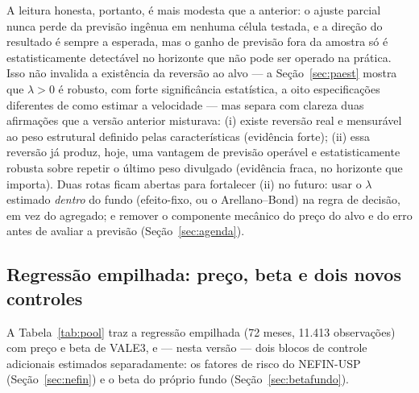 \documentclass[12pt,a4paper]{article}
\begin{document}
A leitura honesta, portanto, é mais modesta que a anterior: o ajuste parcial nunca perde da
previsão ingênua em nenhuma célula testada, e a direção do resultado é sempre a esperada, mas o
ganho de previsão fora da amostra só é estatisticamente detectável no horizonte que não pode ser
operado na prática. Isso não invalida a existência da reversão ao alvo --- a Seção~\ref{sec:paest}
mostra que $\lambda>0$ é robusto, com forte significância estatística, a oito especificações
diferentes de como estimar a velocidade --- mas separa com clareza duas afirmações que a versão
anterior misturava: (i) existe reversão real e mensurável ao peso estrutural definido pelas
características (evidência forte); (ii) essa reversão já produz, hoje, uma vantagem de previsão
operável e estatisticamente robusta sobre repetir o último peso divulgado (evidência fraca, no
horizonte que importa). Duas rotas ficam abertas para fortalecer (ii) no futuro: usar o $\lambda$
estimado \emph{dentro} do fundo (efeito-fixo, ou o Arellano--Bond) na regra de decisão, em vez do
agregado; e remover o componente mecânico do preço do alvo e do erro antes de avaliar a previsão
(Seção~\ref{sec:agenda}).

\subsection{Regressão empilhada: preço, beta e dois novos controles}
\label{sec:pooled}
\label{sec:nefin}

A Tabela~\ref{tab:pool} traz a regressão empilhada (72 meses, 11.413 observações) com preço e
beta de VALE3, e --- nesta versão --- dois blocos de controle adicionais estimados
separadamente: os fatores de risco do NEFIN-USP (Seção~\ref{sec:nefin}) e o beta do próprio
fundo (Seção~\ref{sec:betafundo}).
\end{document}
